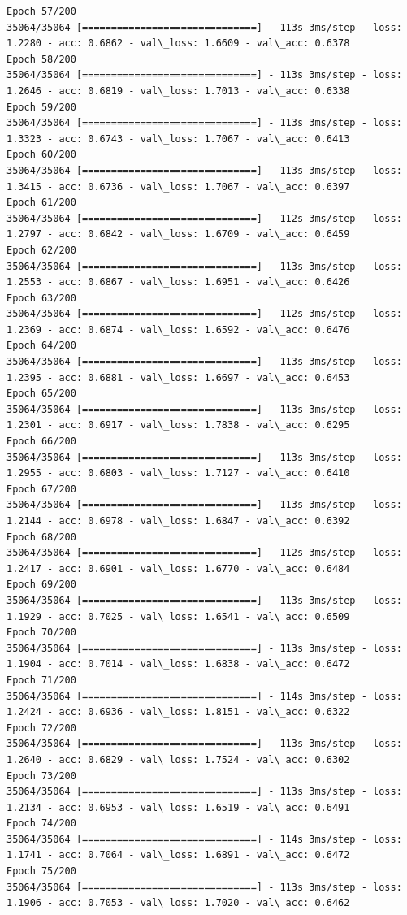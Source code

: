 \documentclass[11pt]{article}
\begin{document}
\begin{Verbatim}[commandchars=\\\{\}]
Epoch 57/200
35064/35064 [==============================] - 113s 3ms/step - loss: 1.2280 - acc: 0.6862 - val\_loss: 1.6609 - val\_acc: 0.6378
Epoch 58/200
35064/35064 [==============================] - 113s 3ms/step - loss: 1.2646 - acc: 0.6819 - val\_loss: 1.7013 - val\_acc: 0.6338
Epoch 59/200
35064/35064 [==============================] - 113s 3ms/step - loss: 1.3323 - acc: 0.6743 - val\_loss: 1.7067 - val\_acc: 0.6413
Epoch 60/200
35064/35064 [==============================] - 113s 3ms/step - loss: 1.3415 - acc: 0.6736 - val\_loss: 1.7067 - val\_acc: 0.6397
Epoch 61/200
35064/35064 [==============================] - 112s 3ms/step - loss: 1.2797 - acc: 0.6842 - val\_loss: 1.6709 - val\_acc: 0.6459
Epoch 62/200
35064/35064 [==============================] - 113s 3ms/step - loss: 1.2553 - acc: 0.6867 - val\_loss: 1.6951 - val\_acc: 0.6426
Epoch 63/200
35064/35064 [==============================] - 112s 3ms/step - loss: 1.2369 - acc: 0.6874 - val\_loss: 1.6592 - val\_acc: 0.6476
Epoch 64/200
35064/35064 [==============================] - 113s 3ms/step - loss: 1.2395 - acc: 0.6881 - val\_loss: 1.6697 - val\_acc: 0.6453
Epoch 65/200
35064/35064 [==============================] - 113s 3ms/step - loss: 1.2301 - acc: 0.6917 - val\_loss: 1.7838 - val\_acc: 0.6295
Epoch 66/200
35064/35064 [==============================] - 113s 3ms/step - loss: 1.2955 - acc: 0.6803 - val\_loss: 1.7127 - val\_acc: 0.6410
Epoch 67/200
35064/35064 [==============================] - 113s 3ms/step - loss: 1.2144 - acc: 0.6978 - val\_loss: 1.6847 - val\_acc: 0.6392
Epoch 68/200
35064/35064 [==============================] - 112s 3ms/step - loss: 1.2417 - acc: 0.6901 - val\_loss: 1.6770 - val\_acc: 0.6484
Epoch 69/200
35064/35064 [==============================] - 113s 3ms/step - loss: 1.1929 - acc: 0.7025 - val\_loss: 1.6541 - val\_acc: 0.6509
Epoch 70/200
35064/35064 [==============================] - 113s 3ms/step - loss: 1.1904 - acc: 0.7014 - val\_loss: 1.6838 - val\_acc: 0.6472
Epoch 71/200
35064/35064 [==============================] - 114s 3ms/step - loss: 1.2424 - acc: 0.6936 - val\_loss: 1.8151 - val\_acc: 0.6322
Epoch 72/200
35064/35064 [==============================] - 113s 3ms/step - loss: 1.2640 - acc: 0.6829 - val\_loss: 1.7524 - val\_acc: 0.6302
Epoch 73/200
35064/35064 [==============================] - 113s 3ms/step - loss: 1.2134 - acc: 0.6953 - val\_loss: 1.6519 - val\_acc: 0.6491
Epoch 74/200
35064/35064 [==============================] - 114s 3ms/step - loss: 1.1741 - acc: 0.7064 - val\_loss: 1.6891 - val\_acc: 0.6472
Epoch 75/200
35064/35064 [==============================] - 113s 3ms/step - loss: 1.1906 - acc: 0.7053 - val\_loss: 1.7020 - val\_acc: 0.6462

\end{Verbatim}
\end{document}
